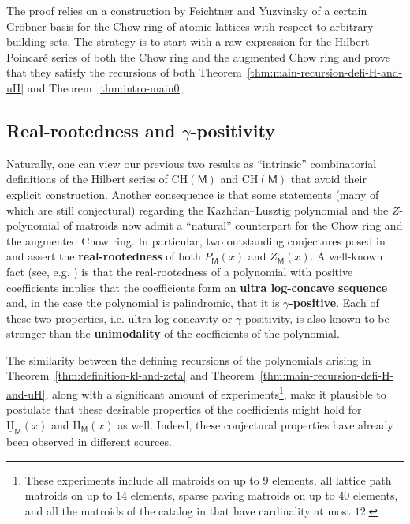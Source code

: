 \documentclass[11pt, a4paper, english]{amsart}
\theoremstyle{teoremas}
\theoremstyle{definition}
\newcommand{\M}{\mathsf{M}}
\renewcommand{\H}{\mathrm{H}}
\newcommand{\CH}{\mathrm{CH}}
\newcommand{\uH}{\underline{\mathrm{H}}}
\newcommand{\uCH}{\underline{\mathrm{CH}}}
\begin{document}
The proof relies on a construction by Feichtner and Yuzvinsky \cite{feichtner-yuzvinsky} of a certain Gr\"obner basis for the Chow ring of atomic lattices with respect to arbitrary building sets. The strategy is to start with a raw expression for the Hilbert--Poincar\'e series of both the Chow ring and the augmented Chow ring and prove that they satisfy the recursions of both Theorem~\ref{thm:main-recursion-defi-H-and-uH} and Theorem~\ref{thm:intro-main0}.

\subsection{Real-rootedness and \texorpdfstring{$\gamma$}{gamma}-positivity}

Naturally, one can view our previous two results as ``intrinsic'' combinatorial definitions of the Hilbert series of $\uCH(\M)$ and $\CH(\M)$ that avoid their explicit construction. Another consequence is that some statements (many of which are still conjectural) regarding the Kazhdan--Lusztig polynomial and the $Z$-polynomial of matroids now admit a ``natural'' counterpart for the Chow ring and the augmented Chow ring. In particular, two outstanding conjectures posed in \cite{gedeon-proudfoot-young-survey} and \cite{proudfoot-xu-young} assert the \textbf{real-rootedness} of both $P_{\M}(x)$ and $Z_{\M}(x)$. A well-known fact (see, e.g. \cite{branden}) is that the real-rootedness of a polynomial with positive coefficients implies that the coefficients form an \textbf{ultra log-concave sequence} and, in the case the polynomial is palindromic, that it is \textbf{$\gamma$-positive}. Each of these two properties, i.e. ultra log-concavity or $\gamma$-positivity, is also known to be stronger than the \textbf{unimodality} of the coefficients of the polynomial.

The similarity between the defining recursions of the polynomials arising in Theorem~\ref{thm:definition-kl-and-zeta} and Theorem~\ref{thm:main-recursion-defi-H-and-uH}, along with a significant amount of experiments\footnote{These experiments include all matroids on up to $9$ elements, all lattice path matroids on up to $14$ elements, sparse paving matroids on up to $40$ elements, and all the matroids of the catalog in \cite{oxley} that have cardinality at most $12$.}, make it plausible to postulate that these desirable properties of the coefficients might hold for $\uH_{\M}(x)$ and $\H_{\M}(x)$ as well. Indeed, these conjectural properties have already been observed in different sources.  %
\end{document}
